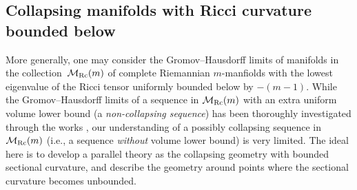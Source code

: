 \documentclass[pdftex]{sigma}
\numberwithin{equation}{section}
\begin{document}
\subsection{Collapsing manifolds with Ricci curvature bounded below}\label{section2.3}
More generally, one may consider the Gromov--Hausdorff limits of manifolds in
the collec\-tion~$\mathcal{M}_{\rm Rc}(m)$ of complete Riemannian $m$-manfiolds with
the lowest eigenvalue of the Ricci tensor uniformly bounded below by $-(m-1)$.
While the Gromov--Hausdorff limits of a sequence in $\mathcal{M}_{\rm Rc}(m)$ with an
extra uniform volume lower bound (a \emph{non-collapsing sequence}) has been
thoroughly investigated through the works \cite{ChCoI, CJN18}, our understanding
of a possibly collapsing sequence in $\mathcal{M}_{\rm Rc}(m)$ (i.e., a sequence
\emph{without} volume lower bound) is very limited. The ideal here is to
develop a parallel theory as the collapsing geometry with bounded
sectional curvature, and describe the geometry around points where the
sectional curvature becomes unbounded.
\end{document}
